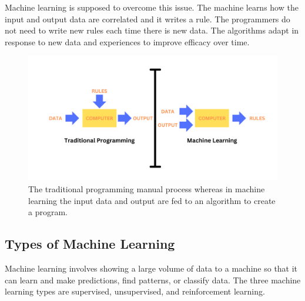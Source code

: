 \documentclass{article}
\begin{document}
Machine learning is supposed to overcome this issue. The machine learns how the input and output data are correlated and it writes a rule. The programmers do not need to write new rules each time there is new data. The algorithms adapt in response to new data and experiences to improve efficacy over time.

\begin{figure}[ht]
\centering
\includegraphics[width=1\textwidth]{image2.png}
\caption{The traditional programming manual process whereas in machine learning the input data and output are fed to an algorithm to create a program.}
\label{fig: the traditional programming vs machine learning.}
\end{figure}

\subsection{Types of Machine Learning}
Machine learning involves showing a large volume of data to a machine so that it can learn and make predictions, find patterns, or classify data. The three machine learning types are supervised, unsupervised, and reinforcement learning.
\end{document}
